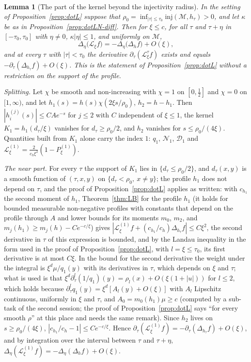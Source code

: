 \documentclass[11pt,a4paper]{article}
\makeatletter
\theoremstyle{stmt}
\newtheorem{lemma}[theorem]{Lemma}
\theoremstyle{defn}
\theoremstyle{rmk}
\renewenvironment{proof}[1][\proofname]{\par\pushQED{\qed}\normalfont\topsep6\p@\@plus6\p@\relax
  \trivlist\item[\hskip\labelsep{\sffamily\itshape\small #1.}]\ignorespaces}{\popQED\endtrivlist\@endpefalse}
\numberwithin{equation}{section}
\newcommand{\M}{\mathcal{M}}
\newcommand{\Lc}{\mathcal{L}}
\makeatother
\begin{document}
{\begin{lemma}[The part of the kernel beyond the injectivity radius]\label{lem:dotL-far}
In the setting of Proposition~\ref{prop:dotL} suppose that $\rho_0=\inf_{|\tau|\le\tau_0}\mathrm{inj}(\M,h_\tau)>0$, and let $\kappa$ be as in Proposition~\ref{prop:dotLN-diff}. Then for $\xi\le c$, for all $\tau$ and $\tau+\eta$ in $[-\tau_0,\tau_0]$ with $\eta\ne0$, $\kappa|\eta|\le1$, and uniformly on $\M$,
\[
\Delta_\eta\big(\Lc_\xi f\big)=-\Delta_\eta\big(\Delta_hf\big)+O(\xi),
\]
and at every $\tau$ with $|\tau|<\tau_0$ the derivative $\partial_\tau(\Lc^\tau_\xi f)$ exists and equals $-\partial_\tau(\Delta_{h_\tau}f)+O(\xi)$. This is the statement of Proposition~\ref{prop:dotL} without a restriction on the support of the profile.
\end{lemma}

\begin{proof}
\emph{Splitting.} Let $\chi$ be smooth and non-increasing with $\chi=1$ on $[0,\frac12]$ and $\chi=0$ on $[1,\infty)$, and let $h_1(s)=h(s)\chi(2\xi s/\rho_0)$, $h_2=h-h_1$. Then $|h_i^{(j)}(s)|\le CAe^{-s}$ for $j\le2$ with $C$ independent of $\xi\le1$, the kernel $K_1=h_1(d_\tau/\xi)$ vanishes for $d_\tau\ge\rho_0/2$, and $h_2$ vanishes for $s\le\rho_0/(4\xi)$. Quantities built from $K_1$ alone carry the index $1$: $q_1$, $\mathcal N_1$, $\mathcal D_1$ and $\Lc^{(1)}_\xi=\frac{2}{c_h\xi^2}(1-P^{(1)}_\xi)$.

\emph{The near part.} For every $\tau$ the support of $K_1$ lies in $\{d_\tau\le\rho_0/2\}$, and $d_\tau(x,y)$ is a smooth function of $(\tau,x,y)$ on $\{d_\tau<\rho_0,\ x\ne y\}$; the profile $h_1$ does not depend on $\tau$, and the proof of Proposition~\ref{prop:dotL} applies as written: with $c_{h_1}$ the second moment of $h_1$, Theorem~\ref{thm:LB} for the profile $h_1$ (it holds for bounded measurable non-negative profiles with constants that depend on the profile through $A$ and lower bounds for its moments $m_0$, $m_2$, and $m_j(h_1)\ge m_j(h)-Ce^{-c/\xi}$) gives $|\Lc^{(1)}_\xi f+(c_{h_1}/c_h)\Delta_{h_\tau}f|\le C\xi^2$, the second derivative in $\tau$ of this expression is bounded, and by the Landau inequality in the form used in the proof of Proposition~\ref{prop:dotL}, with $l=\xi\le\tau_0$, its first derivative is at most $C\xi$. In the bound for the second derivative the weight under the integral is $\xi^d\mu/q_1(y)$ with its derivatives in $\tau$, which depends on $\xi$ and $\tau$; what is used is that $\xi^d\partial_\tau^l(1/q_1)(y)=\rho_l(x)+O(\xi(1+|u|))$ for $l\le2$, which holds because $\partial_\tau^lq_1(y)=\xi^d[A_l(y)+O(\xi)]$ with $A_l$ Lipschitz continuous, uniformly in $\xi$ and $\tau$, and $A_0=m_0(h_1)\mu\ge c$ (computed by a sub-task of the second session; the proof of Proposition~\ref{prop:dotL} says ``for every smooth $\rho$'' at this place and needs the same remark). Since $h_2$ lives on $s\ge\rho_0/(4\xi)$, $|c_{h_1}/c_h-1|\le Ce^{-c/\xi}$. Hence $\partial_\tau(\Lc^{(1)}_\xi f)=-\partial_\tau(\Delta_{h_\tau}f)+O(\xi)$, and by integration over the interval between $\tau$ and $\tau+\eta$, $\Delta_\eta(\Lc^{(1)}_\xi f)=-\Delta_\eta(\Delta_hf)+O(\xi)$.


\end{proof}}
\end{document}
